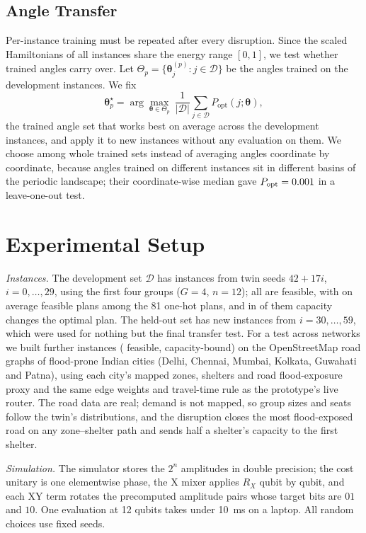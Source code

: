 \documentclass[conference]{IEEEtran}
\begin{document}
\subsection{Angle Transfer}\label{sec:transfer}
Per-instance training must be repeated after every disruption. Since the scaled Hamiltonians of all instances share the energy range $[0,1]$, we test whether trained angles carry over. Let $\Theta_p=\{\boldsymbol\theta_j^{(p)}:j\in\mathcal{D}\}$ be the angles trained on the development instances. We fix
\begin{equation}
\boldsymbol\theta^{\star}_p=\arg\max_{\boldsymbol\theta\in\Theta_p}\ \frac{1}{|\mathcal{D}|}\sum_{j\in\mathcal{D}}P_{\mathrm{opt}}(j;\boldsymbol\theta),
\label{eq:transfer}
\end{equation}
the trained angle set that works best on average across the development instances, and apply it to new instances without any evaluation on them. We choose among whole trained sets instead of averaging angles coordinate by coordinate, because angles trained on different instances sit in different basins of the periodic landscape; their coordinate-wise median gave $P_{\mathrm{opt}}=0.001$ in a leave-one-out test.

\section{Experimental Setup}
\textit{Instances.} The development set $\mathcal{D}$ has \NInst{} instances from twin seeds $42+17i$, $i=0,\dots,29$, using the first four groups ($G=4$, $n=12$); all are feasible, with on average \MeanFeasAssign{} feasible plans among the 81 one-hot plans, and in \NBinding{} of them capacity changes the optimal plan. The held-out set has \HoN{} new instances from $i=30,\dots,59$, which were used for nothing but the final transfer test. For a test across networks we built \CityAll{} further instances (\CityN{} feasible, \CityBinding{} capacity-bound) on the OpenStreetMap road graphs of \CityNCities{} flood-prone Indian cities (Delhi, Chennai, Mumbai, Kolkata, Guwahati and Patna), using each city's mapped zones, shelters and road flood-exposure proxy and the same edge weights and travel-time rule as the prototype's live router. The road data are real; demand is not mapped, so group sizes and seats follow the twin's distributions, and the disruption closes the most flood-exposed road on any zone--shelter path and sends half a shelter's capacity to the first shelter.

\textit{Simulation.} The simulator stores the $2^n$ amplitudes in double precision; the cost unitary is one elementwise phase, the X mixer applies $R_X$ qubit by qubit, and each XY term rotates the precomputed amplitude pairs whose target bits are $01$ and $10$. One evaluation at 12 qubits takes under 10~ms on a laptop. All random choices use fixed seeds.
\end{document}
